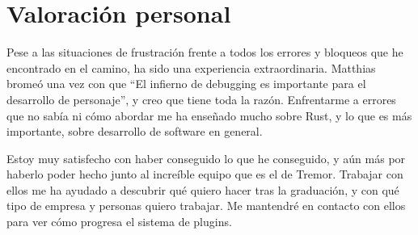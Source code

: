 \section{Valoración personal}

Pese a las situaciones de frustración frente a todos los errores y bloqueos que
he encontrado en el camino, ha sido una experiencia extraordinaria. Matthias
bromeó una vez con que ``El infierno de debugging es importante para el
desarrollo de personaje'', y creo que tiene toda la razón. Enfrentarme a errores
que no sabía ni cómo abordar me ha enseñado mucho sobre Rust, y lo que es más
importante, sobre desarrollo de software en general.

Estoy muy satisfecho con haber conseguido lo que he conseguido, y aún más por
haberlo poder hecho junto al increíble equipo que es el de Tremor. Trabajar con
ellos me ha ayudado a descubrir qué quiero hacer tras la graduación, y con qué
tipo de empresa y personas quiero trabajar. Me mantendré en contacto con ellos
para ver cómo progresa el sistema de plugins.
